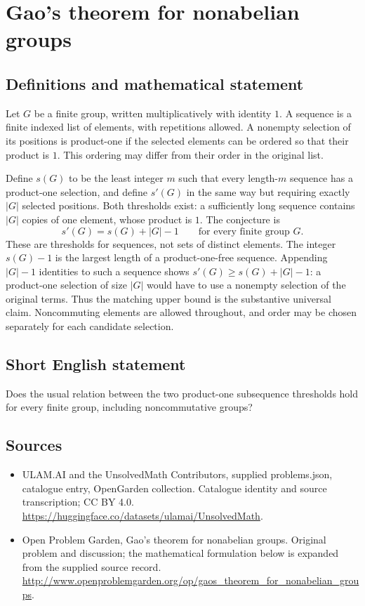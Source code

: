 \documentclass[11pt,a4paper]{article}
\begin{document}
\section*{Gao's theorem for nonabelian groups}\label{statement}

\subsection{Definitions and mathematical statement}
Let $G$ be a finite group, written multiplicatively with identity $1$.
A sequence is a finite indexed list of elements, with repetitions
allowed. A nonempty selection of its positions is product-one if
the selected elements can be ordered so that their product is $1$.
This ordering may differ from their order in the original list.

Define $s(G)$ to be the least integer $m$ such that every length-$m$
sequence has a product-one selection, and define $s'(G)$ in the same
way but requiring exactly $|G|$ selected positions. Both thresholds
exist: a sufficiently long sequence contains $|G|$ copies of one
element, whose product is $1$. The conjecture is
\[
                         s'(G)=s(G)+|G|-1
                   \qquad\text{for every finite group }G.
\]
These are thresholds for sequences, not sets of distinct elements.
The integer $s(G)-1$ is the largest length of a product-one-free
sequence. Appending $|G|-1$ identities to such a sequence shows
$s'(G)\ge s(G)+|G|-1$: a product-one selection of size $|G|$ would
have to use a nonempty selection of the original terms. Thus the
matching upper bound is the substantive universal claim. Noncommuting
elements are allowed throughout, and order may be chosen separately
for each candidate selection.
\subsection{Short English statement}
Does the usual relation between the two product-one subsequence thresholds hold for every finite group, including noncommutative groups?
\subsection{Sources}
\begin{itemize}
\item[S1] ULAM.AI and the UnsolvedMath Contributors, supplied problems.json, catalogue entry, OpenGarden collection. Catalogue identity and source transcription; CC BY 4.0.
\url{https://huggingface.co/datasets/ulamai/UnsolvedMath}.
\item[S2] Open Problem Garden, Gao's theorem for nonabelian groups. Original problem and discussion; the mathematical formulation below is expanded from the supplied source record.
\url{http://www.openproblemgarden.org/op/gaos_theorem_for_nonabelian_groups}.
\end{itemize}
\end{document}
